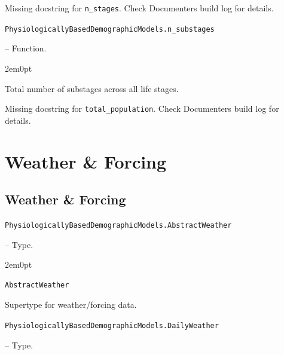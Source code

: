 \begin{tcolorbox}[toptitle=-1mm,bottomtitle=1mm,colback=admonition-warning!50!white,colframe=admonition-warning,title=\textbf{Missing docstring.}]
Missing docstring for \texttt{n\_stages}. Check Documenter{\textquotesingle}s build log for details.

\end{tcolorbox}

\hypertarget{14384702632836559020}{\texttt{PhysiologicallyBasedDemographicModels.n\_substages}}  -- {Function.}

\begin{adjustwidth}{2em}{0pt}

Total number of substages across all life stages.



\end{adjustwidth}

\begin{tcolorbox}[toptitle=-1mm,bottomtitle=1mm,colback=admonition-warning!50!white,colframe=admonition-warning,title=\textbf{Missing docstring.}]
Missing docstring for \texttt{total\_population}. Check Documenter{\textquotesingle}s build log for details.

\end{tcolorbox}


\chapter{Weather \& Forcing}


\section{Weather \& Forcing}



\label{15324109762253437614}{}

\hypertarget{14186617968625219279}{\texttt{PhysiologicallyBasedDemographicModels.AbstractWeather}}  -- {Type.}

\begin{adjustwidth}{2em}{0pt}


\begin{verbatim}
AbstractWeather
\end{verbatim}

Supertype for weather/forcing data.



\end{adjustwidth}
\hypertarget{15288932868204493506}{\texttt{PhysiologicallyBasedDemographicModels.DailyWeather}}  -- {Type.}

